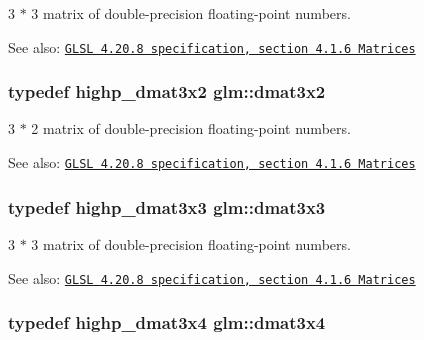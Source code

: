 3 $\ast$ 3 matrix of double-precision floating-point numbers.

\begin{Desc}
\item[See also:]\href{http://www.opengl.org/registry/doc/GLSLangSpec.4.20.8.pdf}{\tt GLSL 4.20.8 specification, section 4.1.6 Matrices} \end{Desc}
\hypertarget{group__core__types_g2db259d2e7921065c5b7d4dca9547960}{
\subsubsection[dmat3x2]{\setlength{\rightskip}{0pt plus 5cm}typedef highp\_\-dmat3x2 {\bf glm::dmat3x2}}}
\label{group__core__types_g2db259d2e7921065c5b7d4dca9547960}


3 $\ast$ 2 matrix of double-precision floating-point numbers.

\begin{Desc}
\item[See also:]\href{http://www.opengl.org/registry/doc/GLSLangSpec.4.20.8.pdf}{\tt GLSL 4.20.8 specification, section 4.1.6 Matrices} \end{Desc}
\hypertarget{group__core__types_gf3c29c4f75a448f308463e75ca2efd4c}{
\subsubsection[dmat3x3]{\setlength{\rightskip}{0pt plus 5cm}typedef highp\_\-dmat3x3 {\bf glm::dmat3x3}}}
\label{group__core__types_gf3c29c4f75a448f308463e75ca2efd4c}


3 $\ast$ 3 matrix of double-precision floating-point numbers.

\begin{Desc}
\item[See also:]\href{http://www.opengl.org/registry/doc/GLSLangSpec.4.20.8.pdf}{\tt GLSL 4.20.8 specification, section 4.1.6 Matrices} \end{Desc}
\hypertarget{group__core__types_g19e745a83cba85f57afa1232276dcc96}{
\subsubsection[dmat3x4]{\setlength{\rightskip}{0pt plus 5cm}typedef highp\_\-dmat3x4 {\bf glm::dmat3x4}}}
\label{group__core__types_g19e745a83cba85f57afa1232276dcc96}


